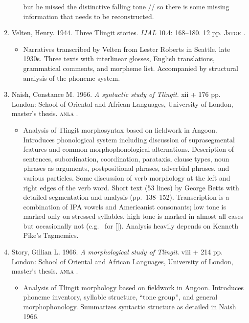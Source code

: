 \documentclass[12pt,letterpaper,oneside,article]{memoir}
\begin{document}
\begin{enumerate}
\begin{itemize}
		but he missed the distinctive falling tone // so there is some missing
		information that needs to be reconstructed.
	\end{itemize}
\item	Velten, Henry.
	1944.
	Three Tlingit stories.
	\textit{IJAL} 10.4: 168–180.
	12 pp.
	\textsc{Jstor} .
	\begin{itemize}
	\item	Narratives transcribed by Velten from  Lester Roberts in Seattle,
		late 1930s.
		Three texts with interlinear glosses, English translations, grammatical
		comments, and morpheme list.
		Accompanied by structural analysis of the phoneme system.
	\end{itemize}
\item	Naish, Constance M.
	1966.
	\textit{A syntactic study of Tlingit}.
	xii + 176 pp.
	London: School of Oriental and African Languages, University of London, master’s thesis.
	\textsc{anla} .
	\begin{itemize}
	\item	Analysis of Tlingit morphosyntax based on fieldwork in Angoon.
		Introduces phonological system including discussion of suprasegmental features
		and common morphophonological alternations.
		Description of sentences, subordination, coordination, parataxis, clause types,
		noun phrases as arguments, postpositional phrases, adverbial phrases, and
		various particles.
		Some discussion of verb morphology at the left and right edges of the verb word.
		Short text (53 lines) by  George Betts with detailed
		segmentation and analysis (pp.\ 138–152).
		Transcription is a combination of IPA vowels and Americanist consonants;
		low tone is marked only on stressed syllables, high tone is marked in almost
		all cases but occasionally not (e.g.\  for  []).
		Analysis heavily depends on Kenneth Pike’s Tagmemics.
	\end{itemize}
\item	Story, Gillian L.
	1966.
	\textit{A morphological study of Tlingit}.
	viii + 214 pp.
	London: School of Oriental and African Languages, University of London, master’s thesis.
	\textsc{anla} .
	\begin{itemize}
	\item	Analysis of Tlingit morphology based on fieldwork in Angoon.
		Introduces phoneme inventory, syllable structure, “tone group”, and
		general morphophonology.
		Summarizes syntactic structure as detailed in Naish 1966.

\end{itemize}
\end{enumerate}
\end{document}
